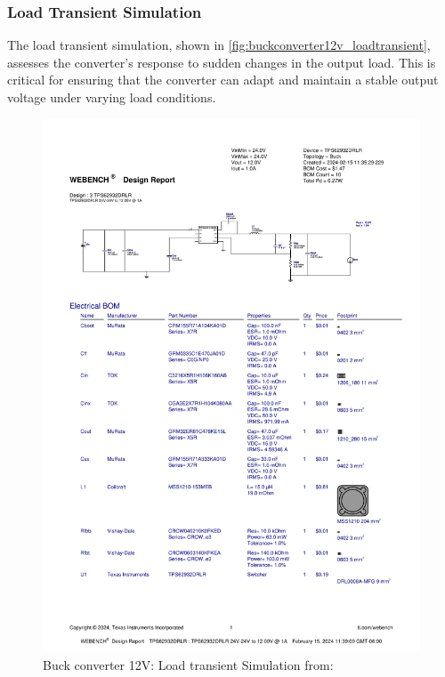 \subsubsection{Load Transient Simulation}
The load transient simulation, shown in \autoref{fig:buckconverter12v_loadtransient}, assesses the converter's response to sudden changes in the output load. This is critical for ensuring that the converter can adapt and maintain a stable output voltage under varying load conditions.
\begin{figure}[H]
    \centering
    \includegraphics[trim=0 235 0 70,clip,width=0.8\linewidth,page=8]{img//buckconverters//12v/WBDesign3_Load Transient.pdf}
    \caption{Buck converter 12V: Load transient Simulation from: %
    }
    \label{fig:buckconverter12v_loadtransient}
\end{figure}

